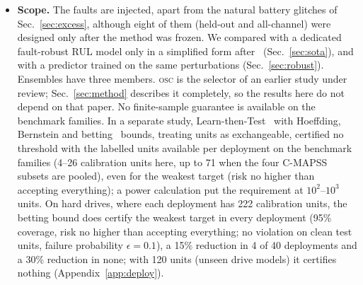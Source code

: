 \documentclass{esannV2}
\newcommand{\OSC}{\textsc{osc}}
\begin{document}
\begin{itemize}
\item \textbf{Scope.} The faults are injected, apart from the natural battery glitches of Sec.~\ref{sec:excess}, although eight of them (held-out and all-channel) were designed only after the method was frozen. We compared with a dedicated fault-robust RUL model only in a simplified form after~\cite{wang2025robustuq} (Sec.~\ref{sec:sota}), and with a predictor trained on the same perturbations (Sec.~\ref{sec:robust}). Ensembles have three members. \OSC{} is the selector of an earlier study under review; Sec.~\ref{sec:method} describes it completely, so the results here do not depend on that paper. No finite-sample guarantee is available on the benchmark families. In a separate study, Learn-then-Test~\cite{angelopoulos2021ltt} with Hoeffding, Bernstein and betting~\cite{waudbysmith2024betting} bounds, treating units as exchangeable, certified no threshold with the labelled units available per deployment on the benchmark families (4--26 calibration units here, up to 71 when the four C-MAPSS subsets are pooled), even for the weakest target (risk no higher than accepting everything); a power calculation put the requirement at $10^2$--$10^3$ units. On hard drives, where each deployment has 222 calibration units, the betting bound does certify the weakest target in every deployment (95\% coverage, risk no higher than accepting everything; no violation on clean test units, failure probability $\epsilon=0.1$), a 15\% reduction in 4 of 40 deployments and a 30\% reduction in none; with 120 units (unseen drive models) it certifies nothing (Appendix~\ref{app:deploy}).
\end{itemize}


\FloatBarrier
\end{document}
